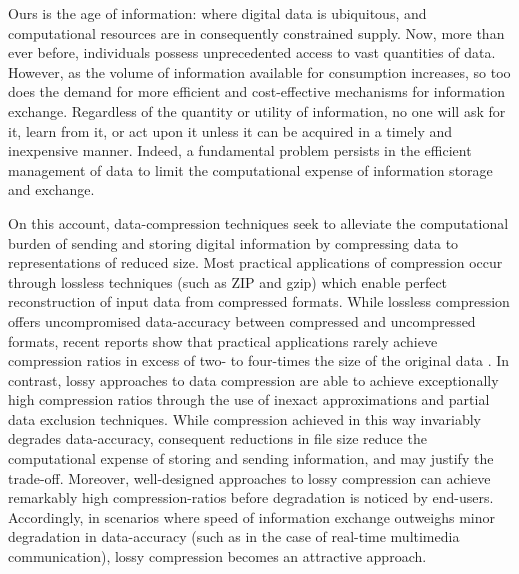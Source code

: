 

\noindent
Ours is the age of information: where digital data is ubiquitous, and computational resources are in consequently constrained supply.
Now, more than ever before, individuals possess unprecedented access to vast quantities of data. 
However, as the volume of information available for consumption increases, so too does the demand for more efficient and cost-effective mechanisms for information exchange. 
Regardless of the quantity or utility of information, no one will ask for it, learn from it, or act upon it unless it can be acquired in a timely and inexpensive manner. 
Indeed, a fundamental problem persists in the efficient management of data to limit the computational expense of information storage and exchange.

On this account, data-compression techniques seek to alleviate the computational burden of sending and storing digital information by compressing data to representations of reduced size.
Most practical applications of compression occur through lossless techniques (such as ZIP and gzip) which enable perfect reconstruction of input data from compressed formats.
While lossless compression offers uncompromised data-accuracy between compressed and uncompressed formats, recent reports show that practical applications rarely achieve compression ratios in excess of two- to four-times the size of the original data \cite{mittal2015survey}.
In contrast, lossy approaches to data compression are able to achieve exceptionally high compression ratios through the use of inexact approximations and partial data exclusion techniques.
While compression achieved in this way invariably degrades data-accuracy, consequent reductions in file size reduce the computational expense of storing and sending information, and may justify the trade-off.
Moreover, well-designed approaches to lossy compression can achieve remarkably high compression-ratios before degradation is noticed by end-users.
Accordingly, in scenarios where speed of information exchange outweighs minor degradation in data-accuracy (such as in the case of real-time multimedia communication), lossy compression becomes an attractive approach. 

